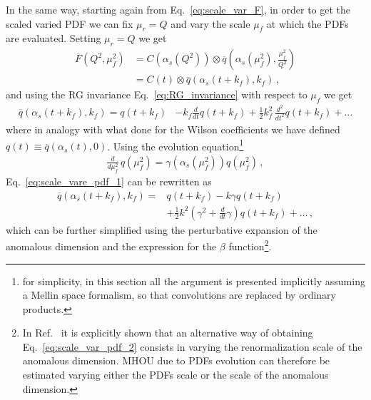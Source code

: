 %
In the same way, starting again from Eq.~\ref{eq:scale_var_F}, in order to get the 
scaled varied PDF we can fix $\mu_r=Q$
and vary the scale $\mu_f$ at which the PDFs are evaluated. Setting $\mu_r=Q$ we get 
\begin{align}
    \overline{F}\left(Q^2,\mu_f^2\right)& = 
    C\left(\alpha_s\left(Q^2\right)\right)\otimes 
    \overline{q}\left(\alpha_s\left(\mu_f^2\right),\frac{\mu_f^2}{Q^2}\right) \nonumber \\
    &=C\left(t\right)\otimes \overline{q}\left(\alpha_s\left(t+k_f\right),k_f\right)\,,
\end{align}
and using the RG invariance Eq.~\ref{eq:RG_invariance} with respect to $\mu_f$ we get 
\begin{align}
    \label{eq:scale_vare_pdf_1}
    \overline{q}\left(\alpha_s\left(t+k_f\right),k_f\right) = q\left(t+k_f\right) &-  k_f\frac{d}{dt}q\left(t+k_f\right) 
    + \frac{1}{2} k_f^2\,\frac{d^2}{dt^2}q\left(t+k_f\right) + ...
\end{align}
where in analogy with what done for the Wilson coefficients we have defined 
$q\left(t\right) \equiv \overline{q}\left(\alpha_s\left(t\right),0\right)$.
Using the evolution equation\footnote{for simplicity, in
this section all the argument is presented implicitly assuming a Mellin space formalism, so that
convolutions are replaced by ordinary products.}
\begin{align}
    \frac{d}{d\mu_f^2}\, q\left(\mu_f^2\right) = \gamma\left(\alpha_s\left(\mu_f^2\right)\right)q\left(\mu_f^2\right)\,,
\end{align}
Eq.~\ref{eq:scale_vare_pdf_1} can be rewritten as 
\begin{align}
    \label{eq:scale_var_pdf_2}
    \overline{q}\left(\alpha_s\left(t+k_f\right),k_f\right) = &q\left(t+k_f\right) - k\gamma q\left(t+k_f\right) \nonumber\\
    &+ \frac{1}{2}k^2\left(\gamma^2 + \frac{d}{dt}\gamma\right)q\left(t+k_f\right) + ...\,,
\end{align}
which can be further simplified using the perturbative expansion of the anomalous dimension
and the expression for the $\beta$ function\footnote{In Ref.~\cite{AbdulKhalek:2019ihb} it is explicitly shown that an 
alternative way of obtaining Eq.~\ref{eq:scale_var_pdf_2} consists in varying the renormalization scale of the anomalous dimension.
MHOU due to PDFs evolution can therefore be estimated varying either the PDFs scale or the scale of the anomalous dimension.}.

